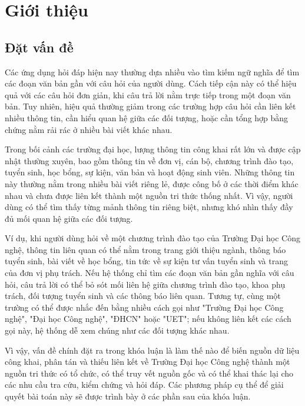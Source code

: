 \chapter{Giới thiệu}

\section{Đặt vấn đề}

Các ứng dụng hỏi đáp hiện nay thường dựa nhiều vào tìm kiếm ngữ nghĩa để tìm các đoạn văn bản gần với câu hỏi của người dùng. Cách tiếp cận này có thể hiệu quả với các câu hỏi đơn giản, khi câu trả lời nằm trực tiếp trong một đoạn văn bản. Tuy nhiên, hiệu quả thường giảm trong các trường hợp câu hỏi cần liên kết nhiều thông tin, cần hiểu quan hệ giữa các đối tượng, hoặc cần tổng hợp bằng chứng nằm rải rác ở nhiều bài viết khác nhau.

Trong bối cảnh các trường đại học, lượng thông tin công khai rất lớn và được cập nhật thường xuyên, bao gồm thông tin về đơn vị, cán bộ, chương trình đào tạo, tuyển sinh, học bổng, sự kiện, văn bản và hoạt động sinh viên. Những thông tin này thường nằm trong nhiều bài viết riêng lẻ, được công bố ở các thời điểm khác nhau và chưa được liên kết thành một nguồn tri thức thống nhất. Vì vậy, người dùng có thể tìm thấy từng mảnh thông tin riêng biệt, nhưng khó nhìn thấy đầy đủ mối quan hệ giữa các đối tượng.

Ví dụ, khi người dùng hỏi về một chương trình đào tạo của Trường Đại học Công nghệ, thông tin liên quan có thể nằm trong trang giới thiệu ngành, thông báo tuyển sinh, bài viết về học bổng, tin tức về sự kiện tư vấn tuyển sinh và trang của đơn vị phụ trách. Nếu hệ thống chỉ tìm các đoạn văn bản gần nghĩa với câu hỏi, câu trả lời có thể bỏ sót mối liên hệ giữa chương trình đào tạo, khoa phụ trách, đối tượng tuyển sinh và các thông báo liên quan. Tương tự, cùng một trường có thể được nhắc đến bằng nhiều cách gọi như "Trường Đại học Công nghệ", "Đại học Công nghệ", "ĐHCN" hoặc "UET"; nếu không liên kết các cách gọi này, hệ thống dễ xem chúng như các đối tượng khác nhau.

Vì vậy, vấn đề chính đặt ra trong khóa luận là làm thế nào để biến nguồn dữ liệu công khai, phân tán và thiếu liên kết về Trường Đại học Công nghệ thành một nguồn tri thức có tổ chức, có thể truy vết nguồn gốc và có thể khai thác lại cho các nhu cầu tra cứu, kiểm chứng và hỏi đáp. Các phương pháp cụ thể để giải quyết bài toán này sẽ được trình bày ở các phần sau của khóa luận.

